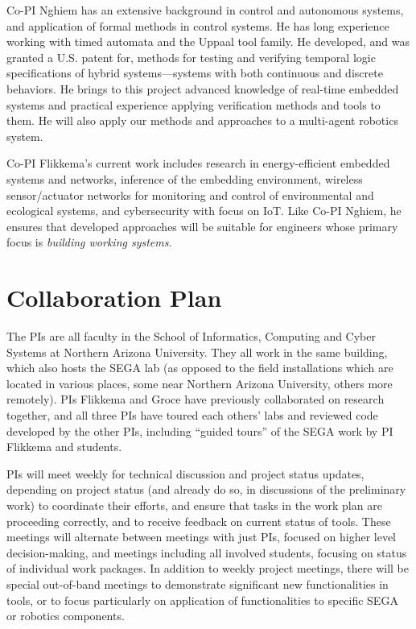 \documentclass{article}
\begin{document}
Co-PI Nghiem has an extensive background in control and autonomous systems, and application of formal methods in control systems.
He has long experience working with timed automata and the Uppaal tool family.
He developed, and was granted a U.S. patent for, methods for testing and verifying temporal logic specifications of hybrid systems---systems with both continuous and discrete behaviors.
He brings to this project advanced knowledge of real-time embedded systems and practical experience applying verification methods and tools to them.
He will also
apply our methods and approaches to a multi-agent robotics system.

Co-PI Flikkema's current work includes research in energy-efficient embedded systems and networks, inference of the embedding environment, wireless sensor/actuator networks for monitoring and control of environmental and ecological systems, and cybersecurity with focus on IoT.  Like Co-PI Nghiem, he ensures that developed approaches will be suitable for engineers whose primary focus is \emph{building working systems}.

\section{Collaboration Plan}

The PIs are all faculty in the School of Informatics, Computing and Cyber Systems at Northern Arizona University.  They all work in the same building, which also hosts the SEGA lab (as opposed to the field installations which are located in various places, some near Northern Arizona University, others more remotely).  PIs Flikkema and Groce have previously collaborated on research together, and all three PIs have toured each others' labs and reviewed code developed by the other PIs, including ``guided tours'' of the SEGA work by PI Flikkema and students.

PIs will meet weekly for technical discussion and project status updates, depending on project status (and already do so, in discussions of the preliminary work) to coordinate their efforts, and ensure that tasks in the work plan are proceeding correctly, and to receive feedback on current status of tools.  These meetings will alternate between meetings with just PIs, focused on higher level decision-making, and meetings including all involved students, focusing on status of individual work packages.
In addition to weekly project meetings, there will be special out-of-band meetings to demonstrate significant new functionalities in tools, or to focus particularly on application of functionalities to specific SEGA or robotics components.
\end{document}
